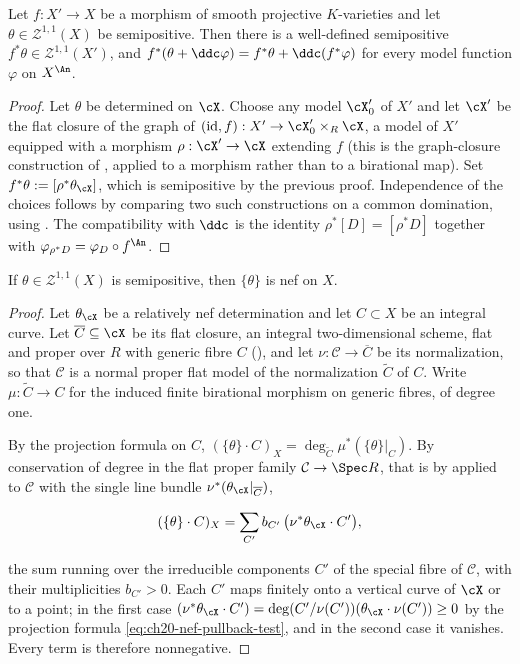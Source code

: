 \begin{corollary}
\label{cor:ch20-pullback-varieties}
Let $f:X'\to X$ be a morphism of smooth projective $K$-varieties and let
$\theta\in\mathcal Z^{1,1}(X)$ be semipositive.  Then there is a
well-defined semipositive $f^*\theta\in\mathcal Z^{1,1}(X')$, and
$f^*(\theta+\ddc\varphi)=f^*\theta+\ddc(f^*\varphi)$ for every model
function $\varphi$ on $X^{\An}$.
\end{corollary}

\begin{proof}
Let $\theta$ be determined on $\cX$.  Choose any model $\cX'_0$ of
$X'$ and let $\cX'$ be the flat closure of the graph of
$(\mathrm{id},f):X'\to\cX'_0\times_R\cX$, a model of $X'$ equipped with a
morphism $\rho:\cX'\to\cX$ extending $f$ (this is the graph-closure
construction of , applied to a morphism rather
than to a birational map).  Set $f^*\theta:=[\rho^*\theta_{\cX}]$, which is
semipositive by the previous proof.  Independence of the choices follows by
comparing two such constructions on a common domination, using
.  The compatibility with $\ddc$ is
the identity $\rho^*[D]=[\rho^*D]$ together with
$\varphi_{\rho^*D}=\varphi_D\circ f^{\An}$.
\end{proof}

\begin{corollary}
\label{cor:ch20-semipositive-generic-nef}
If $\theta\in\mathcal Z^{1,1}(X)$ is semipositive, then $\{\theta\}$ is nef on
$X$.
\end{corollary}

\begin{proof}
Let $\theta_{\cX}$ be a relatively nef determination and let $C\subset X$
be an integral curve.  Let $\overline C\subseteq\cX$ be its flat closure,
an integral two-dimensional scheme, flat and proper over $R$ with generic
fibre $C$ (), and let
$\nu:\mathcal C\to\overline C$ be its normalization, so that
$\mathcal C$ is a normal proper flat model of the normalization
$\widetilde C$ of $C$.  Write $\mu:\widetilde C\to C$ for the induced
finite birational morphism on generic fibres, of degree one.

By the projection formula on $C$,
$(\{\theta\}\cdot C)_X=\deg_{\widetilde C}\mu^*(\{\theta\}|_C)$.  By
conservation of degree in the flat proper family
$\mathcal C\to\Spec R$, that is by
 applied to $\mathcal C$ with the single
line bundle $\nu^*(\theta_{\cX}|_{\overline C})$,

\[
 (\{\theta\}\cdot C)_X
 =\sum_{C'}b_{C'}\,\bigl(\nu^*\theta_{\cX}\cdot C'\bigr),
\]

the sum running over the irreducible components $C'$ of the special fibre
of $\mathcal C$, with their multiplicities $b_{C'}>0$.  Each $C'$ maps
finitely onto a vertical curve of $\cX$ or to a point; in the first case
$(\nu^*\theta_{\cX}\cdot C')=\deg(C'/\nu(C'))(\theta_{\cX}\cdot\nu(C'))\geq0$
by the projection formula \eqref{eq:ch20-nef-pullback-test}, and in the
second case it vanishes.  Every term is therefore nonnegative.
\end{proof}

